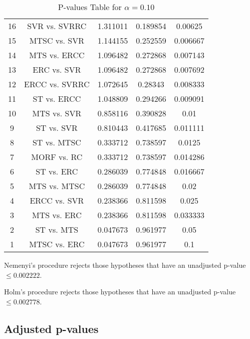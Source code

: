 \documentclass[a4paper,10pt]{article}
\begin{document}
\begin{landscape}
\begin{table}[!htp]
\begin{tabular}{ccccc}
16&SVR vs. SVRRC&1.311011&0.189854&0.00625\\
15&MTSC vs. SVR&1.144155&0.252559&0.006667\\
14&MTS vs. ERCC&1.096482&0.272868&0.007143\\
13&ERC vs. SVR&1.096482&0.272868&0.007692\\
12&ERCC vs. SVRRC&1.072645&0.28343&0.008333\\
11&ST vs. ERCC&1.048809&0.294266&0.009091\\
10&MTS vs. SVR&0.858116&0.390828&0.01\\
9&ST vs. SVR&0.810443&0.417685&0.011111\\
8&ST vs. MTSC&0.333712&0.738597&0.0125\\
7&MORF vs. RC&0.333712&0.738597&0.014286\\
6&ST vs. ERC&0.286039&0.774848&0.016667\\
5&MTS vs. MTSC&0.286039&0.774848&0.02\\
4&ERCC vs. SVR&0.238366&0.811598&0.025\\
3&MTS vs. ERC&0.238366&0.811598&0.033333\\
2&ST vs. MTS&0.047673&0.961977&0.05\\
1&MTSC vs. ERC&0.047673&0.961977&0.1\\
\hline
\end{tabular}
\caption{P-values Table for $\alpha=0.10$}
\end{table}Nemenyi's procedure rejects those hypotheses that have an unadjusted p-value $\le0.002222$.

Holm's procedure rejects those hypotheses that have an unadjusted p-value $\le0.002778$.

\pagebreak

\subsection{Adjusted p-values}


\end{landscape}
\end{document}
